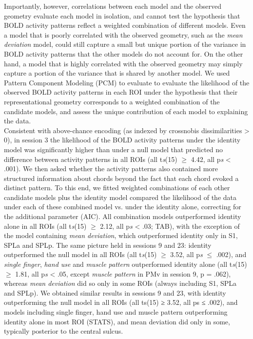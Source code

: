 \documentclass{article}
\begin{document}
Importantly, however, correlations between each model and the observed geometry evaluate each model in isolation, and cannot test the hypothesis that BOLD activity patterns reflect a weighted combination of different models. Even a model that is poorly correlated with the observed geometry, such as the \textit{mean deviation} model, could still capture a small but unique portion of the variance in BOLD activity patterns that the other models do not account for. On the other hand, a model that is highly correlated with the observed geometry may simply capture a portion of the variance that is shared by another model. We used Pattern Component Modeling (PCM) to evaluate to evaluate the likelihood of the observed BOLD activity patterns in each ROI under the hypothesis that their representational geometry corresponds to a weighted combination of the candidate models, and assess the unique contribution of each model to explaining the data. \\

Consistent with above-chance encoding (as indexed by crossnobis dissimilarities > 0), in session 3 the likelihood of the BOLD activity patterns under the identity model was significantly higher than under a null model that predicted no difference between activity patterns in all ROIs (all t\textit{s}(15) $\geq$ 4.42, all p\textit{s} < .001). We then asked whether the activity patterns also contained more structured information about chords beyond the fact that each chord evoked a distinct pattern. To this end, we fitted weighted combinations of each other candidate models plus the identity model compared the likelihood of the data under each of these combined model vs. under the identity alone, correcting for the additional parameter (AIC). All combination models outperformed identity alone in all ROIs (all t\textit{s}(15) $\geq$ 2.12, all p\textit{s} < .03; TAB), with the exception of the model containing \textit{mean deviation}, which outperformed identity only in S1, SPLa and SPLp. The same picture held in sessions 9 and 23: identity outperformed the null model in all ROIs (all t\textit{s}(15) $\geq$ 3.52, all p\textit{s} $\leq$ .002), and \textit{single finger}, \textit{hand use} and \textit{muscle pattern} outperformed identity alone (all t\textit{s}(15) $\geq$ 1.81, all p\textit{s} < .05, except \textit{muscle pattern} in PMv in session 9, p = .062), whereas \textit{mean deviation} did so only in some ROIs (always including S1, SPLa and SPLp). We obtained similar results in sessions 9 and 23, with identity outperforming the null model in all ROIs (all ts(15) ≥ 3.52, all ps ≤ .002), and models including single finger, hand use and muscle pattern outperforming identity alone in most ROI (STATS), and mean deviation did only in some, typically posterior to the central sulcus. \\
\end{document}
